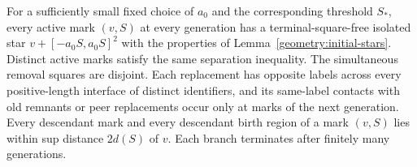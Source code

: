 \begin{lemma}
\label{geometry:repair-induction}
For a sufficiently small fixed choice of $a_0$ and the corresponding
threshold $S_*$, every active mark $(v,S)$ at every generation has a
terminal-square-free isolated star
$v+[-a_0S,a_0S]^2$ with the properties of
Lemma~\ref{geometry:initial-stars}.  Distinct active marks satisfy the same
separation inequality.  The simultaneous removal squares are disjoint.
Each replacement has opposite labels across every positive-length
interface of distinct identifiers, and its same-label contacts with old
remnants or peer replacements occur only at marks of the next generation.
Every descendant mark and every descendant birth region of a mark
$(v,S)$ lies within sup distance $2d(S)$ of $v$.  Each branch terminates
after finitely many generations.
\end{lemma}

